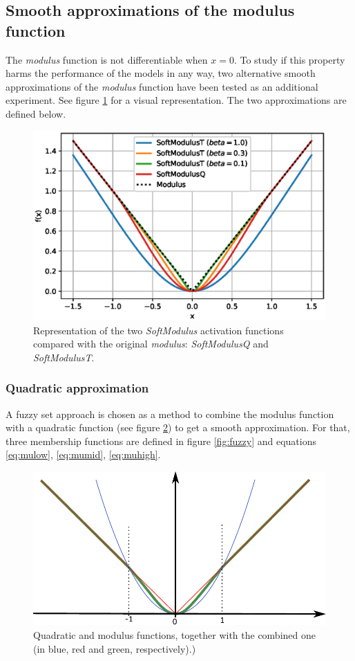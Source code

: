 \subsection{Smooth approximations of the modulus function}
The \textit{modulus} function is not differentiable when $x=0$. To study if this property harms the performance of the models in any way, two alternative smooth approximations of the \textit{modulus} function have been tested as an additional experiment. See figure \ref{fig:activationssmooth} for a visual representation. The two approximations are defined below.


\begin{figure}[h!]
	\centering
	\includegraphics[width=0.5\linewidth]{modulus/images/activations_smooth}
	\caption{Representation of the two \textit{SoftModulus} activation functions compared with the original \textit{modulus}: \textit{SoftModulusQ} and \textit{SoftModulusT}.}
	\label{fig:activationssmooth}
\end{figure}


\subsubsection{Quadratic approximation}
A fuzzy set approach is chosen as a method to combine the modulus function with a quadratic function (see figure \ref{fig:fuzzy_funcs}) to get a smooth approximation. For that, three membership functions are defined in figure \ref{fig:fuzzy} and equations \ref{eq:mulow}, \ref{eq:mumid}, \ref{eq:muhigh}.

\begin{figure}[h!]
	\centering
	\includegraphics[width=0.7\linewidth]{modulus/images/funcs_quad}
	\caption{Quadratic and modulus functions, together with the combined one (in blue, red and green, respectively).)}
	\label{fig:fuzzy_funcs}
\end{figure}

